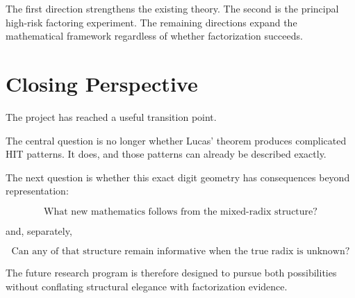 \documentclass[11pt]{article}
\begin{document}
The first direction strengthens the existing theory. The second is the principal high-risk factoring experiment. The remaining directions expand the mathematical framework regardless of whether factorization succeeds.

\section{Closing Perspective}

The project has reached a useful transition point.

The central question is no longer whether Lucas' theorem produces complicated HIT patterns. It does, and those patterns can already be described exactly.

The next question is whether this exact digit geometry has consequences beyond representation:

$$
\boxed{
\text{What new mathematics follows from the mixed-radix structure?}
}
$$

and, separately,

$$
\boxed{
\text{Can any of that structure remain informative when the true radix is unknown?}
}
$$

The future research program is therefore designed to pursue both possibilities without conflating structural elegance with factorization evidence.
\end{document}
